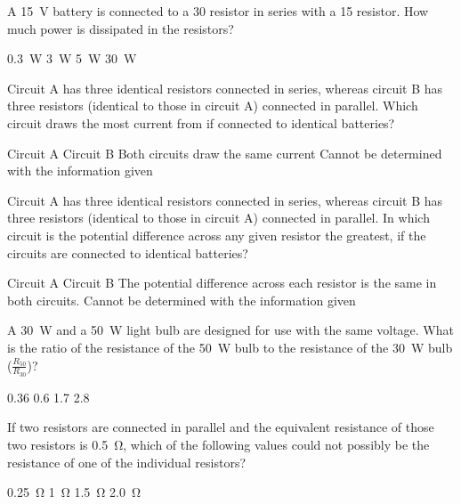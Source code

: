 \question A \SI{15}{V} battery is connected to a \SI{30}{\Omega} resistor in series with a \SI{15}{\Omega} resistor. How much power is dissipated in the resistors?
\begin{checkboxes}
	\choice \SI{0.3}{W}
	\choice \SI{3}{W}
	\CorrectChoice \SI{5}{W}
	\choice \SI{30}{W}
\end{checkboxes}

\question Circuit A has three identical resistors connected in series, whereas circuit B has three resistors (identical to those in circuit A) connected in parallel. Which circuit draws the most current from if connected to identical batteries?
\begin{checkboxes}
\choice Circuit A
\CorrectChoice Circuit B \correct
\choice Both circuits draw the same current
\choice Cannot be determined with the information given
\end{checkboxes}

\question Circuit A has three identical resistors connected in series, whereas circuit B has three resistors (identical to those in circuit A) connected in parallel. In which circuit is the potential difference across any given resistor the greatest, if the circuits are connected to identical batteries?
\begin{checkboxes}
\choice Circuit A
\CorrectChoice Circuit B \correct
\choice The potential difference across each resistor is the same in both circuits.
\choice Cannot be determined with the information given
\end{checkboxes}

\question A \SI{30}{W} and a \SI{50}{W} light bulb are designed for use with the same voltage. What is the ratio of the resistance of the \SI{50}{W} bulb to the resistance of the \SI{30}{W} bulb ($\frac{R_{50}}{R_{30}}$)?
\begin{choices} 
\choice \num{0.36}
\CorrectChoice \num{0.6} \correct
\choice \num{1.7}
\choice \num{2.8}
\end{choices}

\question If two resistors are connected in parallel and the equivalent resistance of those two resistors is \SI{0.5}{\ohm}, which of the following values could not possibly be the resistance of one of the individual resistors?
\begin{choices} 
\CorrectChoice \SI{0.25}{\ohm} \correct
\choice \SI{1}{\ohm}
\choice \SI{1.5}{\ohm}
\choice \SI{2.0}{\ohm}
\end{choices}

